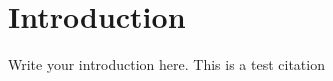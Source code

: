 \section{Introduction}
\label{sec:introduction}
Write your introduction here. This is a test citation \cite{Gruber1995}
